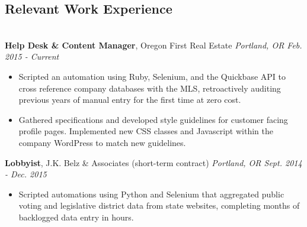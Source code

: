 \documentclass[11pt,line,centered]{res}
\begin{document}
\address{\scriptsize ddykes2@gmail.com | 971-238-4828 | github.com/rsq2}

\begin{resume}
    \bigskip

    \section{\sectionfont\normalsize Relevant Work Experience}\\
    \vspace{1em}
    {\bfseries\footnotesize Help Desk \& Content Manager}, \footnotesize {Oregon First Real Estate \hfill \textit{Portland, OR Feb. 2015 - Current}}\\
        \vspace{-8mm}
        \begin{itemize}
            \setlength\itemsep{0em}
            \item{\footnotesize Scripted an automation using Ruby, Selenium, and the Quickbase API to cross reference company databases with the MLS, retroactively auditing previous years
                                of manual entry for the first time at zero cost.}
            \item{\footnotesize Gathered specifications and developed style guidelines for customer facing profile pages. Implemented new CSS classes and Javascript within the company WordPress
                                to match new guidelines.}\\
        \end{itemize}
        \vspace{-5mm}

    {\bfseries\footnotesize Lobbyist}, \footnotesize {J.K. Belz \& Associates (short-term contract) \hfill \textit{Portland, OR Sept. 2014 - Dec. 2015}}\\
        \vspace{-8mm}
        \begin{itemize}
            \setlength\itemsep{0em}
            \item{\footnotesize Scripted automations using Python and Selenium that aggregated public voting and legislative district data from state websites, completing months of
                                backlogged data entry in hours.}\\
        \end{itemize}


\end{resume}
\end{document}
